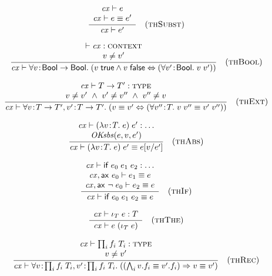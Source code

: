 \[
\frac{\begin{array}{c}\mathit{cx}\vdash e\\\mathit{cx}\vdash e\equiv e'\end{array}}{\mathit{cx}\vdash e'}\quad\mbox{(\textsc{thSubst})}
\]


\[
\frac{\begin{array}{c}\vdash\mathit{cx}:\textsc{context}\\v\neq v'\end{array}}{\mathit{cx}\vdash\forall v\!:\!\mathsf{Bool}\to\mathsf{Bool}.\;(v\;\mathsf{true}\wedge v\;\mathsf{false}\Leftrightarrow(\forall v'\!:\!\mathsf{Bool}.\;v\;v'))}\quad\mbox{(\textsc{thBool})}
\]


\[
\frac{\begin{array}{c}\mathit{cx}\vdash T\to T':\textsc{type}\\v\neq v'\ \wedge\ v'\neq v''\ \wedge\ v''\neq v\end{array}}{\mathit{cx}\vdash\forall v\!:\!T\to T',v'\!:\!T\to T'.\;(v\equiv v'\Leftrightarrow(\forall v''\!:\!T.\;v\;v''\equiv v'\;v''))}\quad\mbox{(\textsc{thExt})}
\]

\[
\frac{\begin{array}{c}\mathit{cx}\vdash(\lambda v\!:\!T.\;e)\;e':\ldots\\\mathit{OKsbs}(e,v,e')\end{array}}{\mathit{cx}\vdash(\lambda v\!:\!T.\;e)\;e'\equiv e[v/e']}\quad\mbox{(\textsc{thAbs})}
\]

\[
\frac{\begin{array}{c}\mathit{cx}\vdash\mathsf{if}\;e_0\;e_1\;e_2:\ldots\\\mathit{cx},\mathsf{ax}\ e_0\vdash e_1\equiv e\\\mathit{cx},\mathsf{ax}\ \neg\;e_0\vdash e_2\equiv e\end{array}}{\mathit{cx}\vdash\mathsf{if}\;e_0\;e_1\;e_2\equiv e}\quad\mbox{(\textsc{thIf})}
\]

\[
\frac{\begin{array}{c}\mathit{cx}\vdash\iota_{T}\;e:T\end{array}}{\mathit{cx}\vdash e\;(\iota_{T}\;e)}\quad\mbox{(\textsc{thThe})}
\]

\[
\frac{\begin{array}{c}\mathit{cx}\vdash\prod_{i}f_i\;T_i:\textsc{type}\\v\neq v'\end{array}}{\mathit{cx}\vdash\forall v\!:\!\prod_{i}f_i\;T_i,v'\!:\!\prod_{i}f_i\;T_i.\;((\bigwedge_{i}v.f_i\equiv v'.f_i)\Rightarrow v\equiv v')}\quad\mbox{(\textsc{thRec})}
\]



